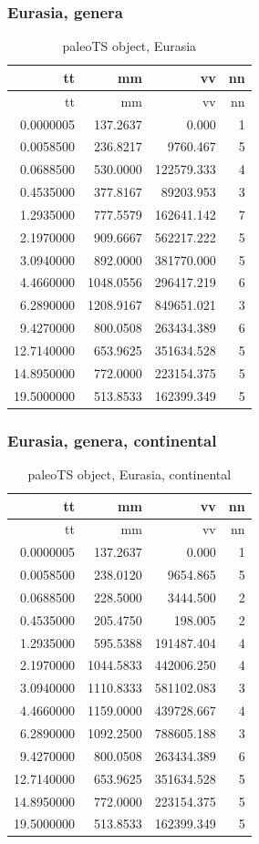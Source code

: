 \FloatBarrier

\subsubsection{Eurasia,	genera}\label{eurasia-genera}


\begin{longtable}[]{@{}rrrr@{}}
	\caption{paleoTS object, Eurasia}
	\label{tab:pTSEs}\tabularnewline
	\toprule
	tt & mm & vv & nn\tabularnewline
	\midrule
	\endfirsthead
	\toprule
	tt & mm & vv & nn\tabularnewline
	\midrule
	\endhead
	0.0000005 & 137.2637 & 0.000 & 1\tabularnewline
	0.0058500 & 236.8217 & 9760.467 & 5\tabularnewline
	0.0688500 & 530.0000 & 122579.333 & 4\tabularnewline
	0.4535000 & 377.8167 & 89203.953 & 3\tabularnewline
	1.2935000 & 777.5579 & 162641.142 & 7\tabularnewline
	2.1970000 & 909.6667 & 562217.222 & 5\tabularnewline
	3.0940000 & 892.0000 & 381770.000 & 5\tabularnewline
	4.4660000 & 1048.0556 & 296417.219 & 6\tabularnewline
	6.2890000 & 1208.9167 & 849651.021 & 3\tabularnewline
	9.4270000 & 800.0508 & 263434.389 & 6\tabularnewline
	12.7140000 & 653.9625 & 351634.528 & 5\tabularnewline
	14.8950000 & 772.0000 & 223154.375 & 5\tabularnewline
	19.5000000 & 513.8533 & 162399.349 & 5\tabularnewline
	\bottomrule
\end{longtable}




\subsubsection{Eurasia, genera,
	continental}\label{eurasiagenera-continental}

\begin{longtable}[]{@{}rrrr@{}}
	\caption{paleoTS object, Eurasia, continental}
	\label{tab:pTSEsC}\tabularnewline
	\toprule
	tt & mm & vv & nn\tabularnewline
	\midrule
	\endfirsthead
	\toprule
	tt & mm & vv & nn\tabularnewline
	\midrule
	\endhead
	0.0000005 & 137.2637 & 0.000 & 1\tabularnewline
	0.0058500 & 238.0120 & 9654.865 & 5\tabularnewline
	0.0688500 & 228.5000 & 3444.500 & 2\tabularnewline
	0.4535000 & 205.4750 & 198.005 & 2\tabularnewline
	1.2935000 & 595.5388 & 191487.404 & 4\tabularnewline
	2.1970000 & 1044.5833 & 442006.250 & 4\tabularnewline
	3.0940000 & 1110.8333 & 581102.083 & 3\tabularnewline
	4.4660000 & 1159.0000 & 439728.667 & 4\tabularnewline
	6.2890000 & 1092.2500 & 788605.188 & 3\tabularnewline
	9.4270000 & 800.0508 & 263434.389 & 6\tabularnewline
	12.7140000 & 653.9625 & 351634.528 & 5\tabularnewline
	14.8950000 & 772.0000 & 223154.375 & 5\tabularnewline
	19.5000000 & 513.8533 & 162399.349 & 5\tabularnewline
	\bottomrule
\end{longtable}

